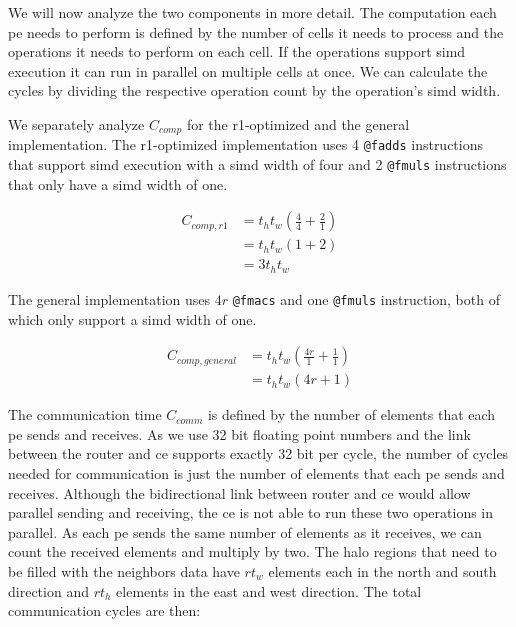 We will now analyze the two components in more detail. The computation each \ac{pe} needs to perform is defined by the number of cells it needs to process and the operations it needs to perform on each cell. If the operations support \ac{simd} execution it can run in parallel on multiple cells at once. We can calculate the cycles by dividing the respective operation count by the operation's \ac{simd} width.

We separately analyze $C_{comp}$ for the r1-optimized and the general implementation. The r1-optimized implementation uses 4 \texttt{@fadds} instructions that support \ac{simd} execution with a \ac{simd} width of four and 2 \texttt{@fmuls} instructions that only have a \ac{simd} width of one.

\begin{equation}
    \begin{aligned}
        \label{eq:c_comp_r1}
        C_{comp,r1} &= t_h t_w \left(\frac{4}{4} + \frac{2}{1}\right) \\[0.5ex]
        &= t_h t_w \left(1 + 2\right) \\[0.5ex]
        &= 3 t_h t_w
    \end{aligned}
\end{equation}

The general implementation uses $4r$ \texttt{@fmacs} and one \texttt{@fmuls} instruction, both of which only support a \ac{simd} width of one.

\begin{equation}
    \label{eq:c_comp_general}
    \begin{aligned}
        C_{comp,general} &= t_h t_w \left(\frac{4r}{1} + \frac{1}{1}\right) \\[0.5ex]
        &= t_h t_w \left(4r + 1\right)
    \end{aligned}
\end{equation}


The communication time $C_{comm}$ is defined by the number of elements that each \ac{pe} sends and receives. As we use 32 bit floating point numbers and the link between the router and \ac{ce} supports exactly 32 bit per cycle, the number of cycles needed for communication is just the number of elements that each \ac{pe} sends and receives. Although the bidirectional link between router and \ac{ce} would allow parallel sending and receiving, the \ac{ce} is not able to run these two operations in parallel. As each \ac{pe} sends the same number of elements as it receives, we can count the received elements and multiply by two. The halo regions that need to be filled with the neighbors data have $r t_w$ elements each in the north and south direction and $r t_h$ elements in the east and west direction. The total communication cycles are then:

